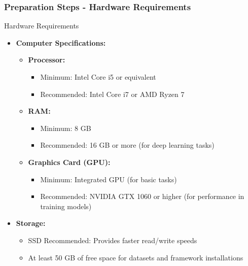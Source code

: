 \documentclass{beamer}
\begin{document}
\begin{frame}[fragile]
    \frametitle{Preparation Steps - Hardware Requirements}
    \begin{block}{Hardware Requirements}
        \begin{itemize}
            \item \textbf{Computer Specifications:}
            \begin{itemize}
                \item \textbf{Processor:} 
                \begin{itemize}
                    \item Minimum: Intel Core i5 or equivalent
                    \item Recommended: Intel Core i7 or AMD Ryzen 7
                \end{itemize}
                \item \textbf{RAM:} 
                \begin{itemize}
                    \item Minimum: 8 GB
                    \item Recommended: 16 GB or more (for deep learning tasks)
                \end{itemize}
                \item \textbf{Graphics Card (GPU):}
                \begin{itemize}
                    \item Minimum: Integrated GPU (for basic tasks)
                    \item Recommended: NVIDIA GTX 1060 or higher (for performance in training models)
                \end{itemize}
            \end{itemize}
            \item \textbf{Storage:}
            \begin{itemize}
                \item SSD Recommended: Provides faster read/write speeds
                \item At least 50 GB of free space for datasets and framework installations
            \end{itemize}
        \end{itemize}
    \end{block}
\end{frame}
\end{document}
